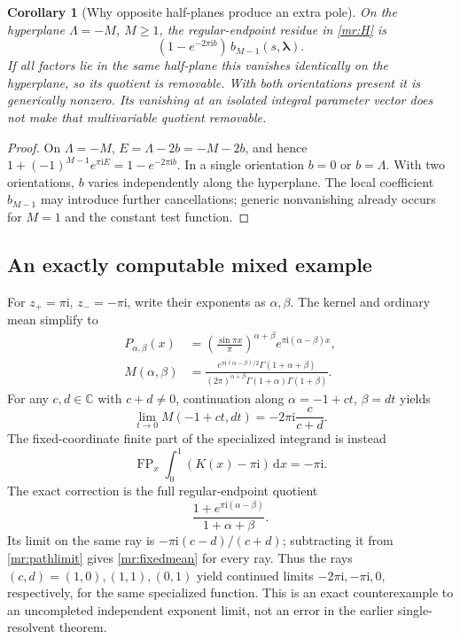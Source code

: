\documentclass[11pt]{article}
\numberwithin{equation}{section}
\theoremstyle{plain}
\newtheorem{corollary}[theorem]{Corollary}
\theoremstyle{definition}
\theoremstyle{remark}
\DeclareMathOperator{\FP}{FP}
\newcommand{\C}{\mathbb C}
\newcommand{\ii}{\mathrm i}
\newcommand{\dd}{\,\mathrm d}
\begin{document}
\begin{corollary}[Why opposite half-planes produce an extra pole]
\label{mr:phasepole}
On the hyperplane $\Lambda=-M$, $M\ge1$, the regular-endpoint
residue in \eqref{mr:H} is
\begin{equation}\label{mr:mixedresidue}
       (1-e^{-2\pi\ii b})\,b_{M-1}(s,\boldsymbol\lambda).
\end{equation}
If all factors lie in the same half-plane this vanishes identically on
the hyperplane, so its quotient is removable. With both orientations
present it is generically nonzero. Its vanishing at an isolated integral
parameter vector does not make that multivariable quotient removable.
\end{corollary}
\begin{proof}
On $\Lambda=-M$, $E=\Lambda-2b=-M-2b$, and hence
$1+(-1)^{M-1}e^{\pi\ii E}=1-e^{-2\pi\ii b}$.
In a single orientation $b=0$ or $b=\Lambda$. With two orientations,
$b$ varies independently along the hyperplane. The local coefficient
$b_{M-1}$ may introduce further cancellations; generic nonvanishing
already occurs for $M=1$ and the constant test function.
\end{proof}

\subsection{An exactly computable mixed example}

For $z_+=\pi\ii$, $z_-=-\pi\ii$, write their exponents as
$\alpha,\beta$. The kernel and ordinary mean simplify to
\begin{align}
 P_{\alpha,\beta}(x)
   &=\left(\frac{\sin\pi x}{\pi}\right)^{\alpha+\beta}
                           e^{\pi\ii(\alpha-\beta)x},\label{mr:specialkernel}\\
 M(\alpha,\beta)
   &=\frac{e^{\pi\ii(\alpha-\beta)/2}\Gamma(1+\alpha+\beta)}
      {(2\pi)^{\alpha+\beta}\Gamma(1+\alpha)\Gamma(1+\beta)}.
       \label{mr:specialmean}
\end{align}
For any $c,d\in\C$ with $c+d\ne0$, continuation along
$\alpha=-1+ct$, $\beta=dt$ yields
\begin{equation}\label{mr:pathlimit}
           \lim_{t\to0}M(-1+ct,dt)=-2\pi\ii\frac{c}{c+d}.
\end{equation}
The fixed-coordinate finite part of the specialized integrand is instead
\begin{equation}\label{mr:fixedmean}
       \FP_x\int_0^1(K(x)-\pi\ii)\dd x=-\pi\ii.
\end{equation}
The exact correction is the full regular-endpoint quotient
\[
 \frac{1+e^{\pi\ii(\alpha-\beta)}}{1+\alpha+\beta}.
\]
Its limit on the same ray is $-\pi\ii(c-d)/(c+d)$; subtracting it
from \eqref{mr:pathlimit} gives \eqref{mr:fixedmean} for every ray.
Thus the rays $(c,d)=(1,0),(1,1),(0,1)$ yield continued limits
$-2\pi\ii,-\pi\ii,0$, respectively, for the same specialized
function. This is an exact counterexample to an uncompleted independent
exponent limit, not an error in the earlier single-resolvent theorem.
\end{document}
